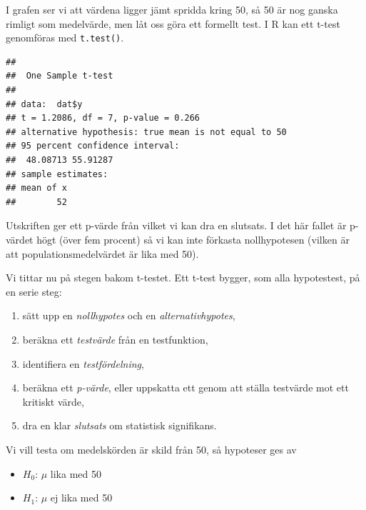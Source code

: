 \documentclass[
]{book}
\newenvironment{Shaded}{\begin{snugshade}}{\end{snugshade}}
\newcommand{\AttributeTok}[1]{\textcolor[rgb]{0.13,0.29,0.53}{#1}}
\newcommand{\CommentTok}[1]{\textcolor[rgb]{0.56,0.35,0.01}{\textit{#1}}}
\newcommand{\DecValTok}[1]{\textcolor[rgb]{0.00,0.00,0.81}{#1}}
\newcommand{\FunctionTok}[1]{\textcolor[rgb]{0.13,0.29,0.53}{\textbf{#1}}}
\newcommand{\NormalTok}[1]{#1}
\newcommand{\SpecialCharTok}[1]{\textcolor[rgb]{0.81,0.36,0.00}{\textbf{#1}}}
\providecommand{\tightlist}{%
  \setlength{\itemsep}{0pt}\setlength{\parskip}{0pt}}
\theoremstyle{definition}
\theoremstyle{definition}
\theoremstyle{definition}
\theoremstyle{definition}
\theoremstyle{remark}
\begin{document}
I grafen ser vi att värdena ligger jämt spridda kring 50, så 50 är nog ganska rimligt som medelvärde, men låt oss göra ett formellt test.
I R kan ett t-test genomföras med \texttt{t.test()}.

\begin{Shaded}
\end{Shaded}

\begin{verbatim}
## 
##  One Sample t-test
## 
## data:  dat$y
## t = 1.2086, df = 7, p-value = 0.266
## alternative hypothesis: true mean is not equal to 50
## 95 percent confidence interval:
##  48.08713 55.91287
## sample estimates:
## mean of x 
##        52
\end{verbatim}

Utskriften ger ett p-värde från vilket vi kan dra en slutsats. I det här fallet är p-värdet högt (över fem procent) så vi kan inte förkasta nollhypotesen (vilken är att populationsmedelvärdet är lika med 50).

Vi tittar nu på stegen bakom t-testet.
Ett t-test bygger, som alla hypotestest, på en serie steg:

\begin{enumerate}
\def\labelenumi{\arabic{enumi}.}
\tightlist
\item
  sätt upp en \emph{nollhypotes} och en \emph{alternativhypotes},
\item
  beräkna ett \emph{testvärde} från en testfunktion,
\item
  identifiera en \emph{testfördelning},
\item
  beräkna ett \emph{p-värde}, eller uppskatta ett genom att ställa testvärde mot ett kritiskt värde,
\item
  dra en klar \emph{slutsats} om statistisk signifikans.
\end{enumerate}

Vi vill testa om medelskörden är skild från 50, så hypoteser ges av

\begin{itemize}
\tightlist
\item
  \(H_0\): \(\mu\) lika med 50
\item
  \(H_1\): \(\mu\) ej lika med 50
\end{itemize}
\end{document}
